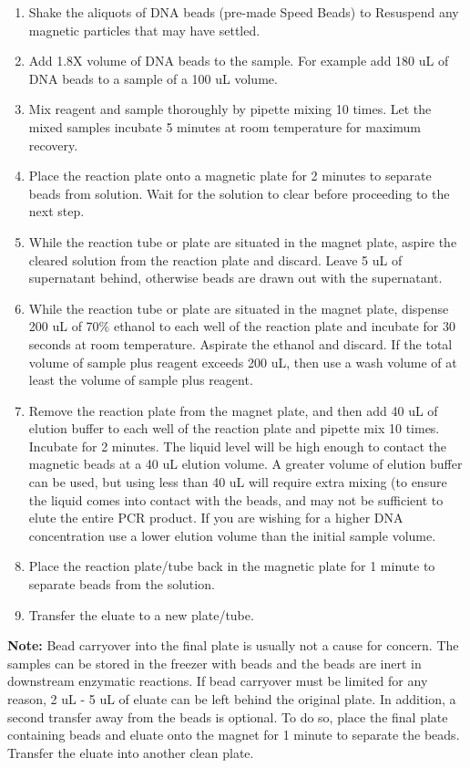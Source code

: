 \documentclass[11pt, oneside]{article}
\begin{document}
	\begin{enumerate}
		\itemsep0mm
		\item Shake the aliquots of DNA beads (pre-made Speed Beads) to Resuspend any magnetic particles that may have settled. 
		\item Add 1.8X volume of DNA beads to the sample. For example add 180 uL of DNA beads to a sample of a 100 uL volume. 
		\item Mix reagent and sample thoroughly by pipette mixing 10 times. Let the mixed samples incubate 5 minutes at room temperature for maximum 		recovery.  
		\item Place the reaction plate onto a magnetic plate for 2 minutes to separate beads from solution. Wait for the solution to clear before proceeding 		to the next step.
		\item While the reaction tube or plate are situated in the magnet plate, aspire the cleared solution from the reaction plate and discard. Leave 5 uL of 		supernatant behind, otherwise beads are drawn out with the supernatant. 
		\item While the reaction tube or plate are situated in the magnet plate, dispense 200 uL of 70\% ethanol to each well of the reaction plate and 			incubate for 30 seconds at room temperature. Aspirate the ethanol and discard. If the total volume of sample plus reagent exceeds 200 uL, then 		use a wash volume of at least the volume of sample plus reagent. 
		\item Remove the reaction plate from the magnet plate, and then add 40 uL of elution buffer to each well of the reaction plate and pipette mix 10 		times. Incubate for 2 minutes. The liquid level will be high enough to contact the magnetic beads at a 40 uL elution volume. A greater volume of 		elution buffer can be used, but using less than 40 uL will require extra mixing (to ensure the liquid comes into contact with the beads, and may not 		be sufficient to elute the entire PCR product. If you are wishing for a higher DNA concentration use a lower elution volume than the initial sample 		volume. 
		\item Place the reaction plate/tube back in the magnetic plate for 1 minute to separate beads from the solution. 
		\item Transfer the eluate to a new plate/tube. 
	\end{enumerate}
	
	\begin{adjustwidth}{0.25in}{0pt}{\bf Note:} Bead carryover into the final plate is usually not a cause for concern. The samples can be stored in the freezer 	with beads and the beads are inert in downstream enzymatic reactions. If bead carryover must be limited for any reason, 2 uL - 5 uL of eluate can be left 	behind the original plate. In addition, a second transfer away from the beads is optional. To do so, place the final plate containing beads and eluate onto 	the magnet for 1 minute to separate the beads. Transfer the eluate into another clean plate. \end{adjustwidth}
\end{document}
